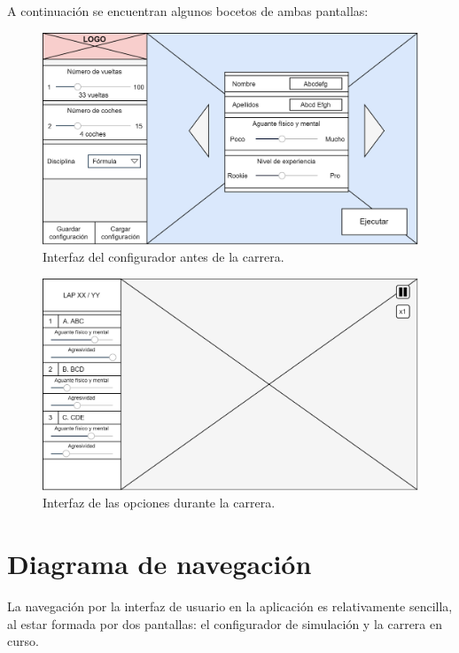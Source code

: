 \bigskip

A continuación se encuentran algunos bocetos de ambas pantallas:

\begin{figure}[H]
    \centering
    \includegraphics[width=\textwidth]{imagenes/pag1.png}
    \caption{Interfaz del configurador antes de la carrera.}
\end{figure}

\begin{figure}[H]
    \centering
    \includegraphics[width=\textwidth]{imagenes/pag2.png}
    \caption{Interfaz de las opciones durante la carrera.}
\end{figure}

\section{Diagrama de navegación}

La navegación por la interfaz de usuario en la aplicación es relativamente sencilla, al estar formada por dos pantallas: el configurador de simulación y la carrera en curso.

